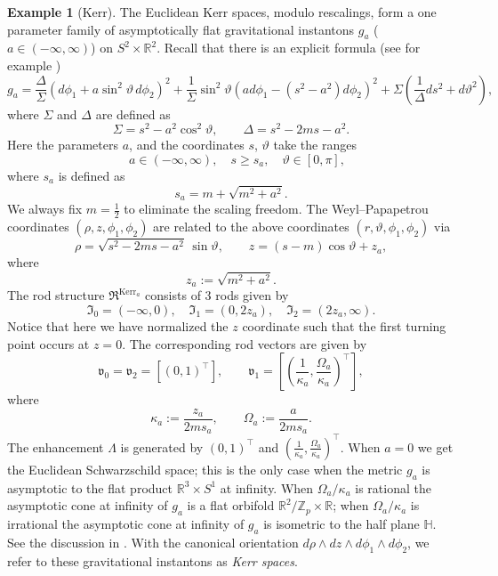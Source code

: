 \documentclass[a4paper,11pt]{amsart}
\theoremstyle{definition}
\newtheorem{example}[theorem]{Example}
\numberwithin{equation}{section}
\newcommand{\R}{\mathbb{R}}
\newcommand{\mv} {\mathfrak v}
\newcommand{\mI} {\mathfrak I}
\newcommand{\mR} {\mathfrak R}
\DeclareMathOperator{\Kerr}{Kerr}
\begin{document}
\begin{example}[Kerr]\label{ex:Kerr}The Euclidean Kerr spaces, modulo rescalings, form a one parameter family of asymptotically flat gravitational instantons $g_a$ ($a\in (-\infty, \infty)$) on  $S^2\times \mathbb R^2$. Recall that there is an explicit formula (see for example \cite{ChenTeo2})
\begin{equation}
g_a = \frac{\Delta}{\Sigma} (d\phi_1 + a \sin^2 \vartheta \, d\phi_2)^2 +\frac{1}{\Sigma}{\sin^2 \vartheta} (a d\phi_1 - (s^2 - a^2) d\phi_2)^2  + \Sigma(\frac{1}{\Delta} ds^2 +  d\vartheta^2),
\label{eq:kerr_instanton}
\end{equation}
where \(\Sigma\) and \(\Delta\) are defined as
\begin{equation}
\Sigma = s^2 - a^2 \cos^2 \vartheta, \qquad \Delta = s^2 - 2ms - a^2.
\end{equation}
Here the parameters  \(a\), and the coordinates \(s\), \(\vartheta\) take the ranges
\[
\quad a\in (-\infty, \infty), \quad s \geq s_a, \quad  \vartheta \in [0,\pi],
\]
where \(s_a\) is defined as
\[
s_a = m + \sqrt{m^2+ a^2}.
\]
We always fix $m=\frac{1}{2}$ to eliminate the scaling freedom. 
The Weyl–Papapetrou coordinates \(( \rho, z, \phi_1, \phi_2)\) are related to the above coordinates $(r, \vartheta, \phi_1, \phi_2)$ via
\begin{equation}
\rho = \sqrt{s^2 - 2ms - a^2} \, \sin \vartheta, \qquad z = (s - m) \cos \vartheta+z_a,
\label{eq:weyl_coords}
\end{equation}where $$z_a:=\sqrt{m^2+a^2}.$$
The rod structure $\mR^{\Kerr_a}$ consists of 3 rods given by 
$$\mI_0=(-\infty, 0),\quad \mI_1=(0, 2z_a),\quad \mI_2=(2z_a, \infty). $$
Notice that here we have normalized the $z$ coordinate such that the first turning point occurs at $z=0$.
The corresponding rod vectors are given by 
$$\mv_0=\mv_2=[(0, 1)^\top], \qquad \mv_1=[(\frac{1}{\kappa_a}, \frac{\Omega_a}{\kappa_a})^\top], $$
where 
$$\kappa_a:=\frac{z_a}{2ms_a}, \qquad \Omega_a:=\frac{a}{2ms_a}.$$
The enhancement $\Lambda$ is generated by $(0, 1)^\top$ and $(\frac{1}{\kappa_a}, \frac{\Omega_a}{\kappa_a})^\top$. When $a=0$ we get the Euclidean Schwarzschild space; this is the only case when the metric $g_a$ is asymptotic to the flat product $\R^3\times S^1$ at infinity. When $\Omega_a/\kappa_a$ is rational the asymptotic cone at infinity of $g_a$ is a flat orbifold $ \mathbb R^2/\mathbb Z_p\times \R$; when $\Omega_a/\kappa_a$ is irrational the asymptotic cone at infinity of $g_a$ is isometric to the half plane $\mathbb H$. See the discussion in \cite{LS2024}. With the canonical orientation $d\rho\wedge dz\wedge d\phi_1\wedge d\phi_2$, we refer to these gravitational instantons as \emph{Kerr spaces}.


\end{example}
\end{document}
